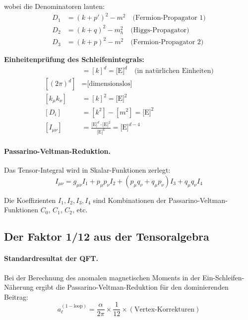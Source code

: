 \documentclass[12pt,a4paper]{article}
\theoremstyle{remark}
\begin{document}
wobei die Denominatoren lauten:
\begin{align}
	D_1 &= (k + p')^2 - m^2 \quad \text{(Fermion-Propagator 1)} \\
	D_2 &= (k + q)^2 - m_h^2 \quad \text{(Higgs-Propagator)} \\
	D_3 &= (k + p)^2 - m^2 \quad \text{(Fermion-Propagator 2)}
\end{align}

\begin{units}
	\textbf{Einheitenprüfung des Schleifenintegrals:}
	\begin{align}
		[d^d k] &= [k]^d = \text{[E]}^d \quad \text{(in natürlichen Einheiten)} \\
		[(2\pi)^d] &= \text{[dimensionslos]} \\
		[k_\mu k_\nu] &= [k]^2 = \text{[E]}^2 \\
		[D_i] &= [k^2] - [m^2] = \text{[E]}^2 \\
		[I_{\mu\nu}] &= \frac{\text{[E]}^d \cdot \text{[E]}^2}{\text{[E]}^6} = \text{[E]}^{d-4}
	\end{align}
\end{units}

\paragraph{Passarino-Veltman-Reduktion.}
Das Tensor-Integral wird in Skalar-Funktionen zerlegt:
\begin{equation}
	I_{\mu\nu} = g_{\mu\nu} I_1 + p_\mu p_\nu I_2 + (p_\mu q_\nu + q_\mu p_\nu) I_3 + q_\mu q_\nu I_4
\end{equation}

Die Koeffizienten $I_1, I_2, I_3, I_4$ sind Kombinationen der Passarino-Veltman-Funktionen $C_0$, $C_1$, $C_2$, etc.

\subsection{Der Faktor 1/12 aus der Tensoralgebra}

\paragraph{Standardresultat der QFT.}
Bei der Berechnung des anomalen magnetischen Moments in der Ein-Schleifen-Näherung ergibt die Passarino-Veltman-Reduktion für den dominierenden Beitrag:
\begin{equation}
	a_\ell^{(1-\text{loop})} = \frac{\alpha}{2\pi} \times \frac{1}{12} \times (\text{Vertex-Korrekturen})
\end{equation}
\end{document}
